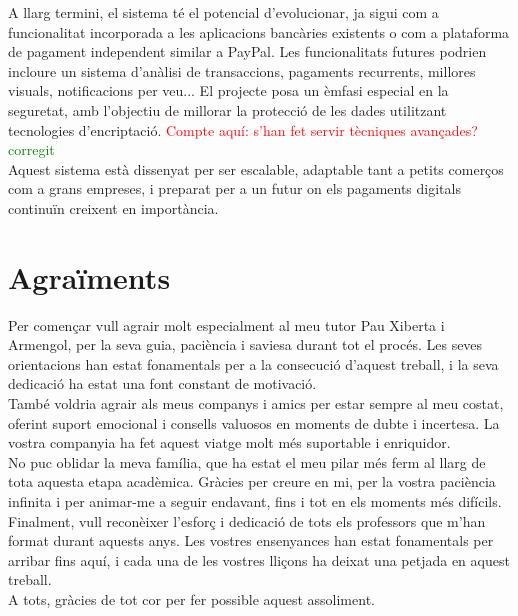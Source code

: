 \documentclass[a4paper,12pt,twoside]{ThesisStyle}
\newcommand{\pau}[1]{\textcolor{red}{#1}}
\newcommand{\sudan}[1]{\textcolor{green}{#1}}
\begin{document}
A llarg termini, el sistema té el potencial d'evolucionar, ja sigui com a funcionalitat incorporada a les aplicacions bancàries existents o com a plataforma de pagament independent similar a PayPal. Les funcionalitats futures podrien incloure un sistema d'anàlisi de transaccions, pagaments recurrents, millores visuals, notificacions per veu... El projecte posa un èmfasi especial en la seguretat, amb l'objectiu de millorar la protecció de les dades utilitzant tecnologies d'encriptació. \pau{Compte aquí: s'han fet servir tècniques avançades?}\sudan{corregit}\\

Aquest sistema està dissenyat per ser escalable, adaptable tant a petits comerços com a grans empreses, i preparat per a un futur on els pagaments digitals continuïn creixent en importància.





\chapter*{Agraïments}
\label{chp:agraiments}

Per començar vull agrair molt especialment al meu tutor Pau Xiberta i Armengol, per la seva guia, paciència i saviesa durant tot el procés. Les seves orientacions han estat fonamentals per a la consecució d'aquest treball, i la seva dedicació ha estat una font constant de motivació.\\

També voldria agrair als meus companys i amics per estar sempre al meu costat, oferint suport emocional i consells valuosos en moments de dubte i incertesa. La vostra companyia ha fet aquest viatge molt més suportable i enriquidor.\\

No puc oblidar la meva família, que ha estat el meu pilar més ferm al llarg de tota aquesta etapa acadèmica. Gràcies per creure en mi, per la vostra paciència infinita i per animar-me a seguir endavant, fins i tot en els moments més difícils.\\

Finalment, vull reconèixer l'esforç i dedicació de tots els professors que \mbox{m'han} format durant aquests anys. Les vostres ensenyances han estat fonamentals per arribar fins aquí, i cada una de les vostres lliçons ha deixat una petjada en aquest treball.\\

A tots, gràcies de tot cor per fer possible aquest assoliment.
\end{document}
